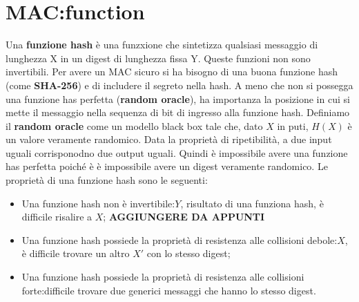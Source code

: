 \documentclass{book}
\theoremstyle{remark}
\begin{document}
\section{MAC:\@Hash function}
Una \textbf{funzione hash} è una funzxione che sintetizza qualsiasi messaggio di lunghezza X in un digest di lunghezza fissa Y\@. Queste funzioni non sono invertibili\@.
Per avere un MAC sicuro si ha bisogno di una buona funzione hash (come \textbf{SHA-256}) e di includere il segreto nella hash\@. A meno che non si possegga una funzione has perfetta (\textbf{random oracle}), ha importanza la posizione in cui si mette il messaggio nella sequenza di bit di ingresso alla funzione hash\@.
Definiamo il \textbf{random oracle} come un modello black box tale che, dato \(X\) in puti, \(H(X)\) è un valore veramente randomico\@.
Data la proprietà di ripetibilità, a due input uguali corrisponodno due output uguali\@. Quindi è impossibile avere una funzione has perfetta poiché è è impossibile avere un digest veramente randomico\@.
Le proprietà di una funzione hash sono le seguenti:
\begin{itemize}
	\item Una funzione hash non è invertibile:\@dato \(Y\), risultato di una funziona hash, è difficile risalire a \(X\);\@
	      \textbf{AGGIUNGERE DA APPUNTI}
	\item Una funzione hash possiede la proprietà di resistenza alle collisioni debole:\@dato \(X\), è difficile trovare un altro \(X'\) con lo stesso digest;\@
	\item Una funzione hash possiede la proprietà di resistenza alle collisioni forte: difficile trovare due generici messaggi che hanno lo stesso digest\@.
\end{itemize}
\end{document}
